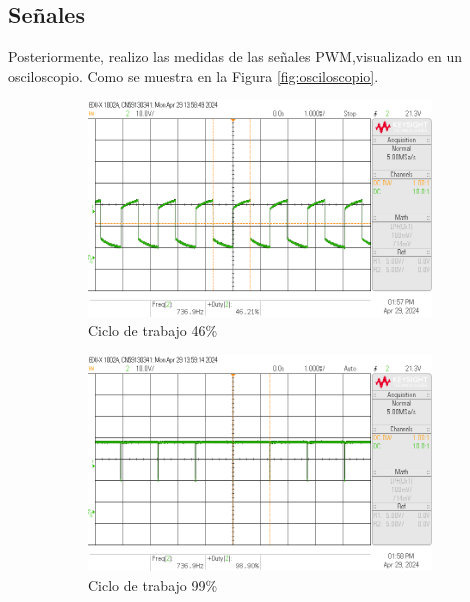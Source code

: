 \documentclass{article}
\begin{document}
\subsection{Señales}
Posteriormente, realizo las medidas de las señales PWM,visualizado en un osciloscopio. Como se muestra en la Figura \ref{fig:osciloscopio}.
\begin{figure}[H]
    \centering
    \begin{subfigure}{.3\textwidth}
        \centering
        \includegraphics[width=\linewidth]{images/scope_1.png}
        \caption{Ciclo de trabajo 46\%}
        \label{fig:pwm_1}
    \end{subfigure}%
    \hfill
    \begin{subfigure}{.3\textwidth}
        \centering
        \includegraphics[width=\linewidth]{images/scope_2.png}
        \caption{Ciclo de trabajo 99\%}
        \label{fig:pwm_2}
    \end{subfigure}
    \hfill
    \begin{subfigure}{.3\textwidth}

\end{subfigure}
\end{figure}
\end{document}

